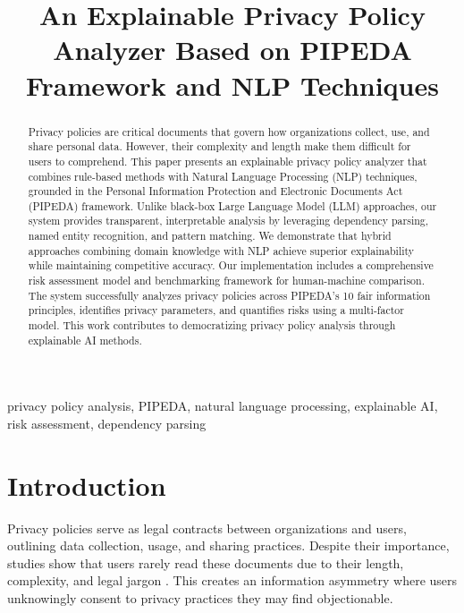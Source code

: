 \documentclass[conference]{IEEEtran}
\begin{document}
\title{An Explainable Privacy Policy Analyzer Based on PIPEDA Framework and NLP Techniques}

\author{
}

\maketitle

\begin{abstract}
Privacy policies are critical documents that govern how organizations collect, use, and share personal data. However, their complexity and length make them difficult for users to comprehend. This paper presents an explainable privacy policy analyzer that combines rule-based methods with Natural Language Processing (NLP) techniques, grounded in the Personal Information Protection and Electronic Documents Act (PIPEDA) framework. Unlike black-box Large Language Model (LLM) approaches, our system provides transparent, interpretable analysis by leveraging dependency parsing, named entity recognition, and pattern matching. We demonstrate that hybrid approaches combining domain knowledge with NLP achieve superior explainability while maintaining competitive accuracy. Our implementation includes a comprehensive risk assessment model and benchmarking framework for human-machine comparison. The system successfully analyzes privacy policies across PIPEDA's 10 fair information principles, identifies privacy parameters, and quantifies risks using a multi-factor model. This work contributes to democratizing privacy policy analysis through explainable AI methods.
\end{abstract}

\begin{IEEEkeywords}
privacy policy analysis, PIPEDA, natural language processing, explainable AI, risk assessment, dependency parsing
\end{IEEEkeywords}

\section{Introduction}

Privacy policies serve as legal contracts between organizations and users, outlining data collection, usage, and sharing practices. Despite their importance, studies show that users rarely read these documents due to their length, complexity, and legal jargon \cite{systematic-review}. This creates an information asymmetry where users unknowingly consent to privacy practices they may find objectionable.
\end{document}
